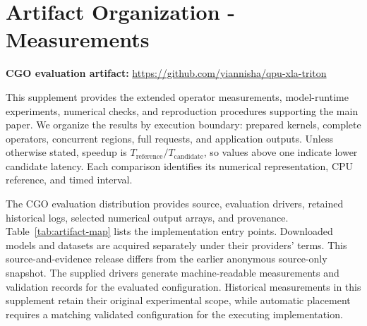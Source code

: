 \documentclass[sigplan,screen,review]{acmart}
\begin{document}
\clearpage
\appendix


\clearpage



\clearpage


\section{Artifact Organization - Measurements}
\label{app:organization}

\noindent\textbf{CGO evaluation artifact:} \url{https://github.com/yiannisha/qpu-xla-triton}

This supplement provides the extended operator measurements, model-runtime experiments, numerical checks, and reproduction procedures supporting the main paper. We organize the results by execution boundary: prepared kernels, complete operators, concurrent regions, full requests, and application outputs. Unless otherwise stated, speedup is \(T_{\mathrm{reference}}/T_{\mathrm{candidate}}\), so values above one indicate lower candidate latency. Each comparison identifies its numerical representation, CPU reference, and timed interval.

The CGO evaluation distribution provides source, evaluation drivers, retained historical logs, selected numerical output arrays, and provenance. Table~\ref{tab:artifact-map} lists the implementation entry points. Downloaded models and datasets are acquired separately under their providers' terms. This source-and-evidence release differs from the earlier anonymous source-only snapshot. The supplied drivers generate machine-readable measurements and validation records for the evaluated configuration. Historical measurements in this supplement retain their original experimental scope, while automatic placement requires a matching validated configuration for the executing implementation.
\end{document}
